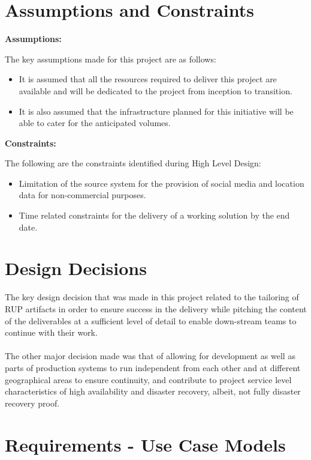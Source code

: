 \documentclass[12pt]{article} %
\begin{document}
		\section{Assumptions and Constraints}
		
		\textbf{Assumptions:}
		
		The key assumptions made for this project are as follows:
		
		\begin{itemize}
			\item It is assumed that all the resources required to deliver this project are available and will be dedicated to the project from inception to transition.
			\item It is also assumed that the infrastructure planned for this initiative will be able to cater for the anticipated volumes.
		\end{itemize}

		\textbf{Constraints:}
		
		The following are the constraints identified during High Level Design:
		\begin{itemize}
			\item Limitation of the source system for the provision of social media and location data for non-commercial purposes.
			\item Time related constraints for the delivery of a working solution by the end date.	
		\end{itemize}
		
		\section {Design Decisions}
		
	The key design decision that was made in this project related to the tailoring of RUP artifacts in order to ensure success in the delivery while pitching the content of the deliverables at a sufficient level of detail to enable down-stream teams to continue with their work.
	\\
	\\
	The other major decision made was that of allowing for development as well as parts of production systems to run independent from each other and at different geographical areas to ensure continuity, and contribute to project service level characteristics of high availability and disaster recovery, albeit, not fully disaster recovery proof. 
	
    \section{Requirements - Use Case Models}
  
\end{document}
